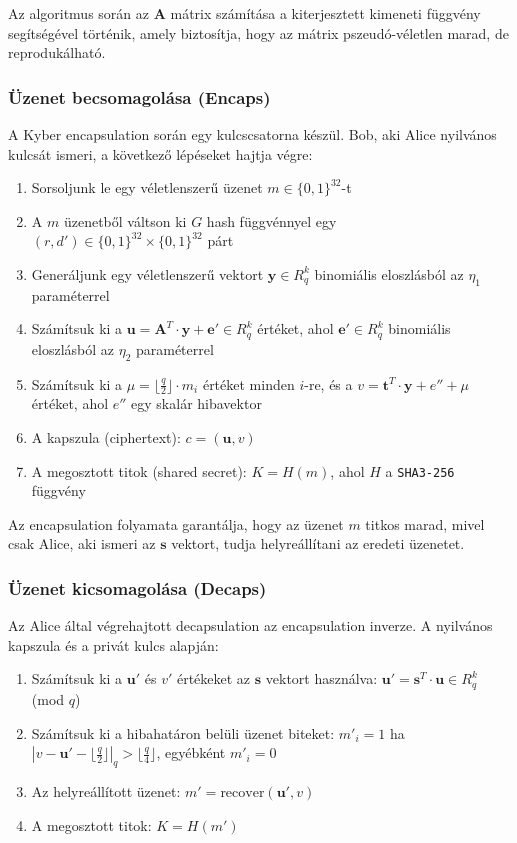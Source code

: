 Az algoritmus során az $\mathbf{A}$ mátrix számítása a kiterjesztett kimeneti függvény segítségével történik, 
amely biztosítja, hogy az mátrix pszeudó-véletlen marad, de reprodukálható.

\subsubsection{Üzenet becsomagolása (Encaps)}

A Kyber encapsulation során egy kulcscsatorna készül. Bob, aki Alice nyilvános kulcsát ismeri, 
a következő lépéseket hajtja végre:

\begin{enumerate}
    \item Sorsoljunk le egy véletlenszerű üzenet $m \in \{0,1\}^{32}$-t
    \item A $m$ üzenetből váltson ki $G$ hash függvénnyel egy $(r, d') \in \{0,1\}^{32} \times \{0,1\}^{32}$ párt
    \item Generáljunk egy véletlenszerű vektort $\mathbf{y} \in R_q^k$ binomiális eloszlásból az $\eta_1$ paraméterrel
    \item Számítsuk ki a $\mathbf{u} = \mathbf{A}^T \cdot \mathbf{y} + \mathbf{e}' \in R_q^k$ értéket, 
        ahol $\mathbf{e}' \in R_q^k$ binomiális eloszlásból az $\eta_2$ paraméterrel
    \item Számítsuk ki a $\mu = \lfloor \frac{q}{2} \rfloor \cdot m_i$ értéket minden $i$-re, és 
        a $v = \mathbf{t}^T \cdot \mathbf{y} + e'' + \mu$ értéket, ahol $e''$ egy skalár hibavektor
    \item A kapszula (ciphertext): $c = (\mathbf{u}, v)$
    \item A megosztott titok (shared secret): $K = H(m)$, ahol $H$ a \texttt{SHA3-256} függvény
\end{enumerate}

Az encapsulation folyamata garantálja, hogy az üzenet $m$ titkos marad, mivel csak Alice, 
aki ismeri az $\mathbf{s}$ vektort, tudja helyreállítani az eredeti üzenetet.

\subsubsection{Üzenet kicsomagolása (Decaps)}

Az Alice által végrehajtott decapsulation az encapsulation inverze. A nyilvános kapszula 
és a privát kulcs alapján:

\begin{enumerate}
    \item Számítsuk ki a $\mathbf{u}'$ és $v'$ értékeket az $\mathbf{s}$ vektort használva: 
        $\mathbf{u}' = \mathbf{s}^T \cdot \mathbf{u} \in R_q^k$ (mod $q$)
    \item Számítsuk ki a hibahatáron belüli üzenet biteket: 
        $m'_i = 1$ ha $|v - \mathbf{u}' - \lfloor \frac{q}{2} \rfloor|_q > \lfloor \frac{q}{4} \rfloor$, 
        egyébként $m'_i = 0$
    \item Az helyreállított üzenet: $m' = \text{recover}(\mathbf{u}', v)$
    \item A megosztott titok: $K = H(m')$
\end{enumerate}

